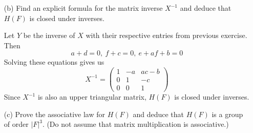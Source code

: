 \documentclass[12pt]{article}
\begin{document}
\begin{enumerate}
\begin{enumerate}
        \item[(b)] Find an explicit formula for the matrix
        inverse $X^{-1}$ and deduce that $H(F)$ is closed
        under inverses.
        \begin{mybox}
            
            Let $Y$ be the inverse of $X$ with
            their respective entries from previous
            exercise. Then
            $$a+d=0,\ f+c=0, \ e+af+b=0$$
            Solving these equations gives us
            $$X^{-1}=\left(\begin{array}{ccc}
                1 & -a & ac-b\\
                0 & 1 & -c\\
                0 & 0 & 1 \end{array}
                \right)$$
            Since $X^{-1}$ is also an upper triangular
            matrix, $H(F)$ is closed under inverses.
        \end{mybox}

        \item[(c)] Prove the associative law for $H(F)$ and
        deduce that $H(F)$ is a group of order $|F|^3$.
        (Do not assume that matrix multiplication
        is associative.)
        \begin{mybox}
            

\end{mybox}
\end{enumerate}
\end{enumerate}
\end{document}
